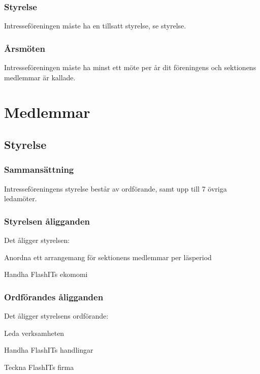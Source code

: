 \documentclass[11pt, noincludeaddress]{classes/cthit}
\begin{document}
\subsubsection{Styrelse}
Intresseföreningen måste ha en tillsatt styrelse, se {styrelse}.

\subsubsection{Årsmöten}
Intresseföreningen måste ha minst ett möte per år dit föreningens 
och sektionens medlemmar är kallade.

\newpage

\section{Medlemmar}

\subsection{Styrelse}
\label{styrelse}

\subsubsection{Sammansättning}
Intresseföreningens styrelse består av ordförande, samt upp till 7
övriga ledamöter.

\subsubsection{Styrelsen åligganden}
Det åligger styrelsen:

\begin{att}
        \item Anordna ett arrangemang för sektionens medlemmar per läsperiod
        \item Handha FlashITs ekomomi
\end{att}

\subsubsection{Ordförandes åligganden}
Det åligger styrelsens ordförande:

\begin{att}
        \item Leda verksamheten
        \item Handha FlashITs handlingar
        \item Teckna FlashITs firma
\end{att}
\end{document}
